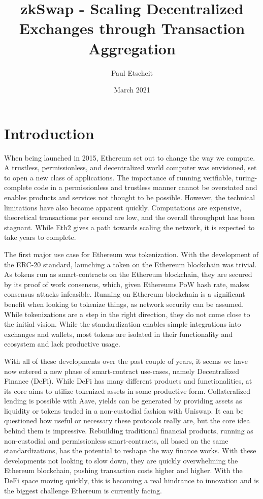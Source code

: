 \documentclass[11pt,twoside,a4paper,final]{book}
\title{zkSwap - Scaling Decentralized Exchanges through Transaction Aggregation}
\author{Paul Etscheit}
\date{March 2021}
\begin{document}
\begin{titlepage}
\maketitle
\end{titlepage}

\section{Introduction}
When being launched in 2015, Ethereum set out to change the way we compute. A trustless, permissionless, and decentralized world computer was envisioned, set to open a new class of applications. The importance of running verifiable, turing-complete code in a permissionless and trustless manner cannot be overstated and enables products and services not thought to be possible. However, the technical limitations have also become apparent quickly. Computations are expensive, theoretical transactions per second are low, and the overall throughput has been stagnant. While Eth2 gives a path towards scaling the network, it is expected to take years to complete. 

The first major use case for Ethereum was tokenization. With the development of the ERC-20 standard, launching a token on the Ethereum blockchain was trivial. As tokens run as smart-contracts on the Ethereum blockchain, they are secured by its proof of work consensus, which, given Ethereums PoW hash rate, makes consensus attacks infeasible. Running on Ethereum blockchain is a significant benefit when looking to tokenize things, as network security can be assumed. While tokenizations are a step in the right direction, they do not come close to the initial vision. While the standardization enables simple integrations into exchanges and wallets, most tokens are isolated in their functionality and ecosystem and lack productive usage.

With all of these developments over the past couple of years, it seems we have now entered a new phase of smart-contract use-cases, namely Decentralized Finance (DeFi). While DeFi has many different products and functionalities, at its core aims to utilize tokenized assets in some productive form. Collateralized lending is possible with Aave, yields can be generated by providing assets as liquidity or tokens traded in a non-custodial fashion with Uniswap. It can be questioned how useful or necessary these protocols really are, but the core idea behind them is impressive. Rebuilding traditional financial products, running as non-custodial and permissionless smart-contracts, all based on the same standardizations, has the potential to reshape the way finance works. With these developments not looking to slow down, they are quickly overwhelming the Ethereum blockchain, pushing transaction costs higher and higher. With the DeFi space moving quickly, this is becoming a real hindrance to innovation and is the biggest challenge Ethereum is currently facing. 
\end{document}
